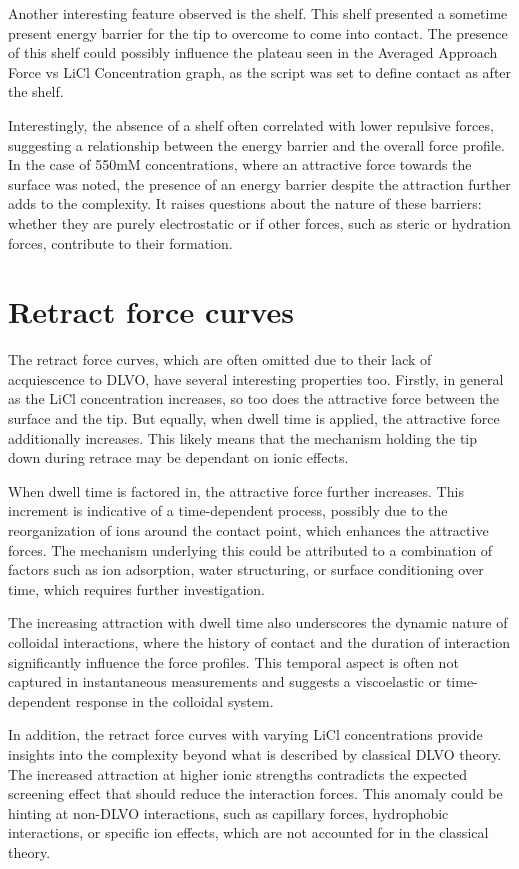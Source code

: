 Another interesting feature observed is the shelf. This shelf presented a sometime present energy barrier for the tip to overcome to come into contact. The presence of this shelf could possibly influence the plateau seen in the Averaged Approach Force vs LiCl Concentration graph, as the script was set to define contact as after the shelf.

Interestingly, the absence of a shelf often correlated with lower repulsive forces, suggesting a relationship between the energy barrier and the overall force profile. In the case of 550mM concentrations, where an attractive force towards the surface was noted, the presence of an energy barrier despite the attraction further adds to the complexity. It raises questions about the nature of these barriers: whether they are purely electrostatic or if other forces, such as steric or hydration forces, contribute to their formation.

\section{Retract force curves}

The retract force curves, which are often omitted due to their lack of acquiescence to DLVO, have several interesting properties too. Firstly, in general as the LiCl concentration increases, so too does the attractive force between the surface and the tip. But equally, when dwell time is applied, the attractive force additionally increases. This likely means that the mechanism holding the tip down during retrace may be dependant on ionic effects.

When dwell time is factored in, the attractive force further increases. This increment is indicative of a time-dependent process, possibly due to the reorganization of ions around the contact point, which enhances the attractive forces. The mechanism underlying this could be attributed to a combination of factors such as ion adsorption, water structuring, or surface conditioning over time, which requires further investigation.

The increasing attraction with dwell time also underscores the dynamic nature of colloidal interactions, where the history of contact and the duration of interaction significantly influence the force profiles. This temporal aspect is often not captured in instantaneous measurements and suggests a viscoelastic or time-dependent response in the colloidal system.

In addition, the retract force curves with varying LiCl concentrations provide insights into the complexity beyond what is described by classical DLVO theory. The increased attraction at higher ionic strengths contradicts the expected screening effect that should reduce the interaction forces. This anomaly could be hinting at non-DLVO interactions, such as capillary forces, hydrophobic interactions, or specific ion effects, which are not accounted for in the classical theory.

